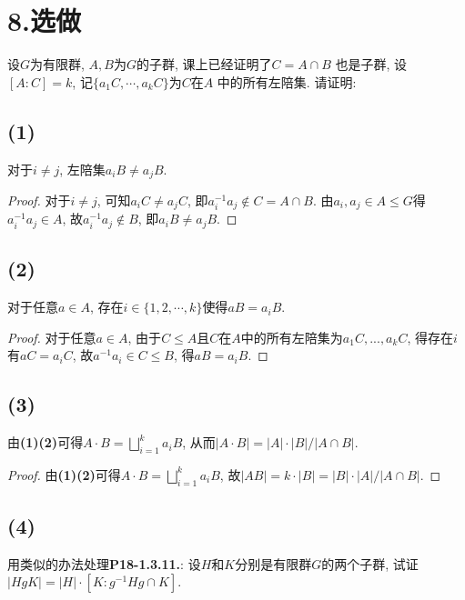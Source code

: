 \documentclass[12pt, a4paper, fontset=windows]{ctexart}
\newcommand{\abs}[1]{\left|{#1}\right|}
\newcommand{\xuan}{{\normalsize 选做}}
\begin{document}
\section*{8.\xuan}

设$G$为有限群, $A,B$为$G$的子群, 课上已经证明了$C=A\cap B$
也是子群, 设$[A:C]=k$, 记$\{a_1C,\cdots,a_kC\}$为$C$在$A$
中的所有左陪集. 请证明: 

\subsection*{(1)}

对于$i\ne j$, 左陪集$a_iB\ne a_jB$. 

\begin{proof}
对于$i\ne j$, 可知$a_iC\ne a_jC$, 即$a_i^{-1}a_j\notin C=A\cap B$. 
由$a_i,a_j\in A\le G$得$a_i^{-1}a_j\in A$, 故$a_i^{-1}a_j\notin B$, 
即$a_iB\ne a_jB$. 
\end{proof}

\subsection*{(2)}

对于任意$a\in A$, 存在$i\in\{1,2,\cdots,k\}$使得$aB=a_iB$. 

\begin{proof}
对于任意$a\in A$, 由于$C\le A$且$C$在$A$中的所有左陪集为$a_1C,...,a_kC$, 
得存在$i$有$aC=a_iC$, 故$a^{-1}a_i\in C\le B$, 得$aB=a_iB$. 
\end{proof}

\subsection*{(3)}

由{\bf (1)(2)}可得$A\cdot B=\bigsqcup^k_{i=1}a_iB$, 
从而$\abs{A\cdot B}=\abs{A}\cdot\abs{B}/\abs{A\cap B}$. 

\begin{proof}
由{\bf (1)(2)}可得$A\cdot B=\bigsqcup^k_{i=1}a_iB$, 故$\abs{AB}=k\cdot\abs{B}=\abs{B}\cdot\abs{A}/\abs{A\cap B}$. 
\end{proof}

\subsection*{(4)}

用类似的办法处理{\bf P18-1.3.11.}: 设$H$和$K$分别是有限群$G$的两个子群, 
试证$\abs{HgK}=\abs{H}\cdot[K:g^{-1}Hg\cap K]$. 
\end{document}
